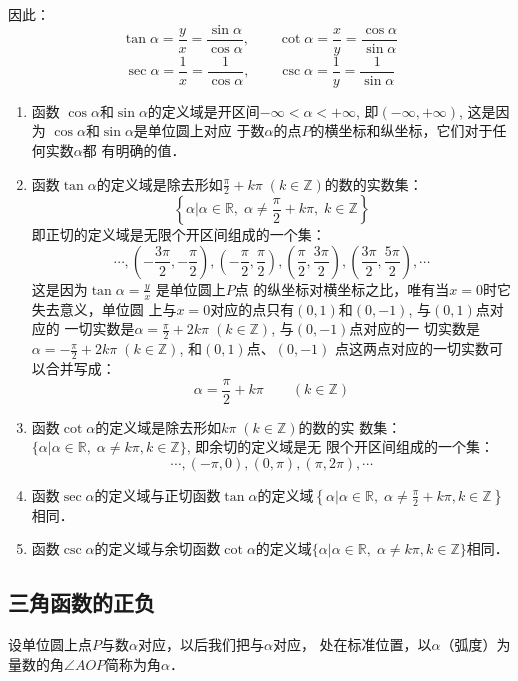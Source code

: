 因此：
\[\tan\alpha=\frac{y}{x}=\frac{\sin\alpha}{\cos\alpha},\qquad \cot\alpha=\frac{x}{y}=\frac{\cos\alpha}{\sin\alpha}\]
\[ \sec\alpha=\frac{1}{x}=\frac{1}{\cos\alpha},\qquad \csc\alpha=\frac{1}{y}=\frac{1}{\sin\alpha}\]

\begin{enumerate}
    \item 函数 $\cos\alpha$和$\sin\alpha$的定义域是开区间$-\infty<\alpha<+\infty$,
    即$(-\infty,+\infty)$, 这是因为 $\cos\alpha$和$\sin\alpha$是单位圆上对应
    于数$\alpha$的点$P$的横坐标和纵坐标，它们对于任何实数$\alpha$都
    有明确的值．
\item 函数$\tan\alpha$的定义域是除去形如$\frac{\pi}{2}+k\pi\; (k\in\mathbb{Z})$的数的实数集：
    \[\left\{\alpha\Big|\alpha\in\mathbb{R},\; \alpha\ne \frac{\pi}{2}+k\pi, \; k\in\mathbb{Z} \right\} \]
    即正切的定义域是无限个开区间组成的一个集：
\[\cdots, \left(-\frac{3\pi}{2},-\frac{\pi}{2}\right), \left(-\frac{\pi}{2},\frac{\pi}{2}\right), \left(\frac{\pi}{2},\frac{3\pi}{2}\right),\left(\frac{3\pi}{2},\frac{5\pi}{2}\right),\cdots\]
这是因为$\tan\alpha =\frac{y}{x}$
是单位圆上$P$点
的纵坐标对横坐标之比，唯有当$x=0$时它失去意义，单位圆
上与$x=0$对应的点只有$(0,1)$和$(0,-1)$, 与$(0,1)$点对应的
一切实数是$\alpha=\frac{\pi}{2}+2k\pi\; (k\in\mathbb{Z})$, 与$(0,-1)$点对应的一
切实数是$\alpha=-\frac{\pi}{2}+2k\pi\; (k\in\mathbb{Z})$, 和$(0,1)$点、$(0,-1)$
点这两点对应的一切实数可以合并写成：
\[\alpha=\frac{\pi}{2}+k\pi\qquad  (k\in\mathbb{Z})\]
\item 函数$\cot\alpha$的定义域是除去形如$k\pi\;  (k\in\mathbb{Z})$的数的实
数集：$\{\alpha|\alpha\in\mathbb{R},\; \alpha\ne k\pi ,k\in\mathbb{Z}\}$, 即余切的定义域是无
限个开区间组成的一个集：
\[\cdots, (-\pi ,0),(0,\pi ),(\pi ,2\pi ),\cdots\]
\item 函数$\sec\alpha$的定义域与正切函数$\tan\alpha$的定义域$\left\{\alpha\Big|\alpha\in\mathbb{R},\;  \alpha\ne \frac{\pi}{2}+k\pi ,k\in\mathbb{Z}\right\}$相同．
\item 函数$\csc\alpha$的定义域与余切函数$\cot\alpha$的定义域$\{\alpha|\alpha\in\mathbb{R},\; \alpha\ne k\pi ,k\in\mathbb{Z}\}$相同．
\end{enumerate}

\subsection{三角函数的正负}
设单位圆上点$P$与数$\alpha$对应，以后我们把与$\alpha$对应，
处在标准位置，以$\alpha$（弧度）为量数的角$\angle AOP$简称为角$\alpha$．

